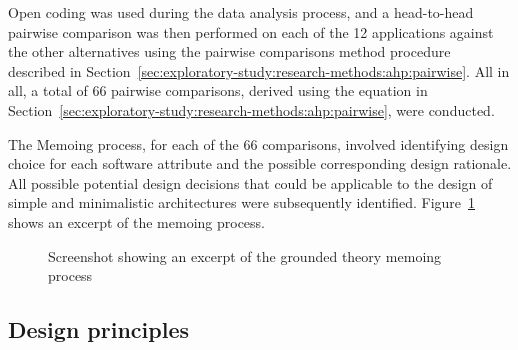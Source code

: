 \tablespacing

\bodyspacing

Open coding \citep{Glaser1992} was used during the data analysis
process, and a head-to-head pairwise comparison was then performed on each of
the 12 applications against the other alternatives using the
pairwise comparisons method procedure described in Section~\ref{sec:exploratory-study:research-methods:ahp:pairwise}. All in all, a total
of 66 pairwise comparisons, derived using the equation in Section~\ref{sec:exploratory-study:research-methods:ahp:pairwise}, were conducted. 

The Memoing process, for each of the 66 comparisons, involved
identifying design choice for each software attribute and the possible
corresponding design rationale. All possible potential design decisions that
could be applicable to the design of simple and minimalistic architectures were
subsequently identified. Figure~\ref{fig:exploratory-study:general-approach:data-analysis:memoing-process}
shows an excerpt of the memoing process.

\begin{figure}
 \begin{center}
 \caption[Screenshot showing an excerpt of the GT memoing process]{Screenshot showing an excerpt of the grounded theory memoing process}
 \label{fig:exploratory-study:general-approach:data-analysis:memoing-process}
 \end{center}
\end{figure}



%

%

\subsection{Design principles}
\label{sec:exploratory-study:methodology:design-principles}

